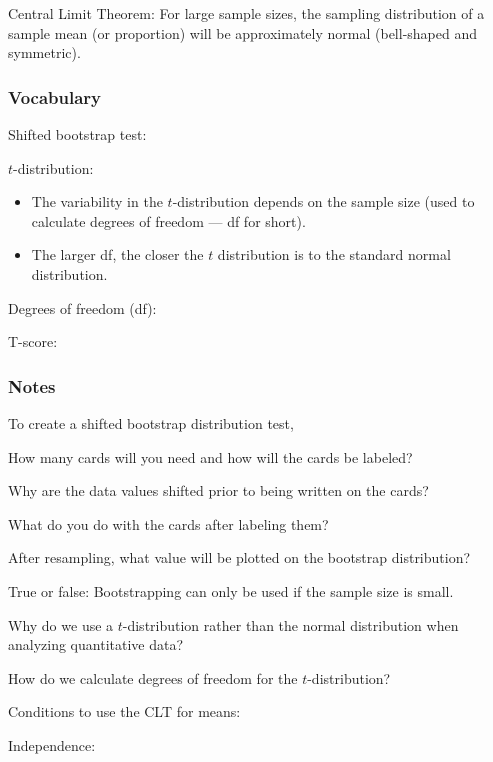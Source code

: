 \documentclass[
]{report}
\newcommand{\rgs}{\vspace{12pt}} %
\newcommand{\rgi}{\hspace{24pt}}  %
\begin{document}
Central Limit Theorem: For large sample sizes, the sampling distribution of a sample mean (or proportion) will be approximately normal (bell-shaped and symmetric).

\hypertarget{vocabulary-2}{%
\subsubsection*{Vocabulary}\label{vocabulary-2}}

Shifted bootstrap test:
\rgs

\(t\)-distribution:
\rgs 

\begin{itemize}
\item
  The variability in the \(t\)-distribution depends on the sample size (used to calculate degrees of freedom --- df for short).
\item
  The larger df, the closer the \(t\) distribution is to the standard normal distribution.
\end{itemize}

Degrees of freedom (df):
\rgs 

T-score:
\rgs 

\hypertarget{notes-2}{%
\subsubsection*{Notes}\label{notes-2}}

To create a shifted bootstrap distribution test,

\rgi How many cards will you need and how will the cards be labeled?
\rgs 

\rgi Why are the data values shifted prior to being written on the cards?
\rgs

\rgi What do you do with the cards after labeling them?
\rgs 

\rgi After resampling, what value will be plotted on the bootstrap distribution?
\rgs 

True or false: Bootstrapping can only be used if the sample size is small.
\rgs 

Why do we use a \(t\)-distribution rather than the normal distribution when analyzing quantitative data?
\rgs 

How do we calculate degrees of freedom for the \(t\)-distribution?
\rgs 

Conditions to use the CLT for means:

\rgi Independence:
\rgs 
\end{document}
